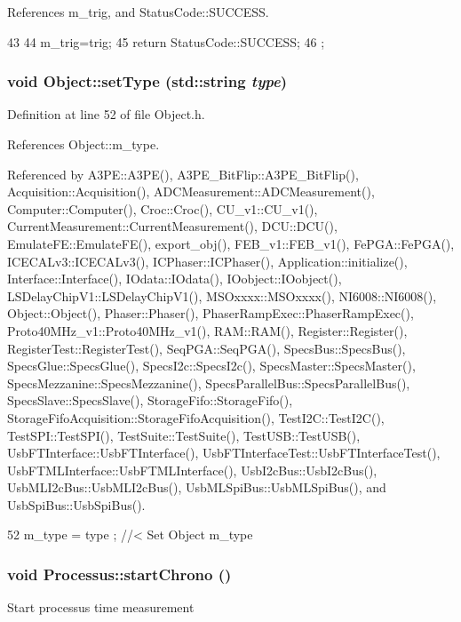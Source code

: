References m\_\-trig, and StatusCode::SUCCESS.


\begin{DoxyCode}
43                                    {
44     m_trig=trig; 
45     return StatusCode::SUCCESS;
46   };
\end{DoxyCode}
\hypertarget{classObject_aae534cc9d982bcb9b99fd505f2e103a5}{
\subsubsection[{setType}]{\setlength{\rightskip}{0pt plus 5cm}void Object::setType (std::string {\em type})}}
\label{classObject_aae534cc9d982bcb9b99fd505f2e103a5}


Definition at line 52 of file Object.h.

References Object::m\_\-type.

Referenced by A3PE::A3PE(), A3PE\_\-BitFlip::A3PE\_\-BitFlip(), Acquisition::Acquisition(), ADCMeasurement::ADCMeasurement(), Computer::Computer(), Croc::Croc(), CU\_\-v1::CU\_\-v1(), CurrentMeasurement::CurrentMeasurement(), DCU::DCU(), EmulateFE::EmulateFE(), export\_\-obj(), FEB\_\-v1::FEB\_\-v1(), FePGA::FePGA(), ICECALv3::ICECALv3(), ICPhaser::ICPhaser(), Application::initialize(), Interface::Interface(), IOdata::IOdata(), IOobject::IOobject(), LSDelayChipV1::LSDelayChipV1(), MSOxxxx::MSOxxxx(), NI6008::NI6008(), Object::Object(), Phaser::Phaser(), PhaserRampExec::PhaserRampExec(), Proto40MHz\_\-v1::Proto40MHz\_\-v1(), RAM::RAM(), Register::Register(), RegisterTest::RegisterTest(), SeqPGA::SeqPGA(), SpecsBus::SpecsBus(), SpecsGlue::SpecsGlue(), SpecsI2c::SpecsI2c(), SpecsMaster::SpecsMaster(), SpecsMezzanine::SpecsMezzanine(), SpecsParallelBus::SpecsParallelBus(), SpecsSlave::SpecsSlave(), StorageFifo::StorageFifo(), StorageFifoAcquisition::StorageFifoAcquisition(), TestI2C::TestI2C(), TestSPI::TestSPI(), TestSuite::TestSuite(), TestUSB::TestUSB(), UsbFTInterface::UsbFTInterface(), UsbFTInterfaceTest::UsbFTInterfaceTest(), UsbFTMLInterface::UsbFTMLInterface(), UsbI2cBus::UsbI2cBus(), UsbMLI2cBus::UsbMLI2cBus(), UsbMLSpiBus::UsbMLSpiBus(), and UsbSpiBus::UsbSpiBus().


\begin{DoxyCode}
52 { m_type  = type  ; } //< Set Object m_type
\end{DoxyCode}
\hypertarget{classProcessus_a5e4d34b86241fa0756e07375a14ff4b2}{
\subsubsection[{startChrono}]{\setlength{\rightskip}{0pt plus 5cm}void Processus::startChrono ()}}
\label{classProcessus_a5e4d34b86241fa0756e07375a14ff4b2}
Start processus time measurement 

